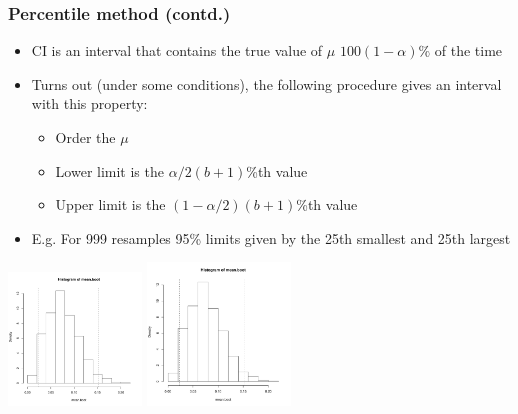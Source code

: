 \documentclass[a4paper,12pt]{article}
\newcommand{\bc}{\begin{center}}
\newcommand{\ec}{\end{center}}
\newcommand{\bi}{\begin{itemize}}
\newcommand{\ei}{\end{itemize}}
\begin{document}
\begin{frame}[fragile]
    \frametitle{Percentile method (contd.)}
    \bi
        \item <1->CI is an interval that contains the true value of $\mu$ $100(1-\alpha)\%$ of the time
        \item <2->Turns out (under some conditions), the following procedure gives an interval with this property:
				\bi
				  \item <2-> Order the $\mu$\\
				  \item <2-> Lower limit is the $\alpha/2(b+1)$\%th value\\
				  \item <2-> Upper limit is the $(1-\alpha/2)(b+1)$\%th value
        \ei
        \item <3->E.g. For 999 resamples 95\% limits given by the 25th smallest and 25th largest
    \ei
     {\bc
          {\includegraphics[height=1.4in]{HistMeanBootCI}}
          {\includegraphics[height=1.5in]{HistMeanBootCI}}
    \ec}
\end{frame}
\end{document}
